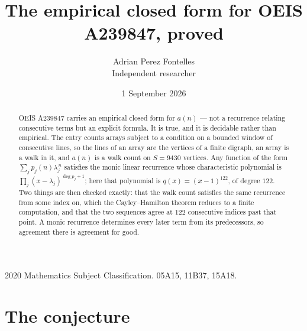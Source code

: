\documentclass[11pt,a4paper]{article}
\title{The empirical closed form for OEIS A239847, proved}
\author{Adrian Perez Fontelles\\ \small Independent researcher}
\date{1 September 2026}
\theoremstyle{plain}
\theoremstyle{definition}
\begin{document}
\maketitle

\begin{abstract}
OEIS A239847 carries an empirical closed form for $a(n)$ --- not a recurrence relating
consecutive terms but an explicit formula. It is true, and it is decidable rather than
empirical. The entry counts arrays subject to a condition on a bounded window of consecutive lines, so the lines of an array are the
vertices of a finite digraph, an array is a walk in it, and $a(n)$ is a walk count on
$S=9430$ vertices. Any function of the form $\sum_j p_j(n)\lambda_j^{\,n}$ satisfies the
monic linear recurrence whose characteristic polynomial is
$\prod_j(x-\lambda_j)^{\deg p_j+1}$; here that polynomial is $q(x)=(x-1)^{122}$, of degree
$122$. Two things are then checked exactly: that the walk count satisfies the same
recurrence from some index on, which the Cayley--Hamilton theorem reduces to a finite
computation, and that the two sequences agree at $122$ consecutive indices past that
point. A monic recurrence determines every later term from its predecessors, so agreement
there is agreement for good.
\end{abstract}

\noindent\small 2020 Mathematics Subject Classification. 05A15, 11B37, 15A18.\normalsize

\section{The conjecture}
\end{document}
